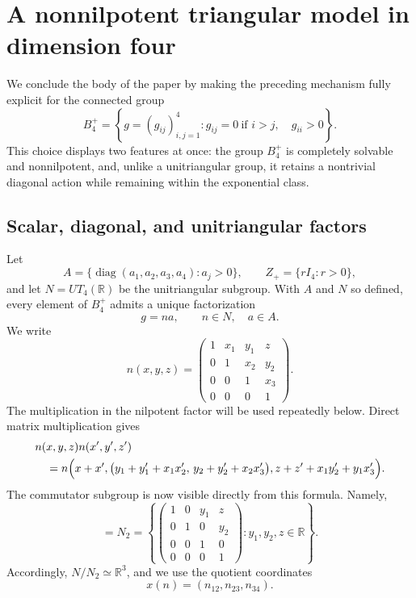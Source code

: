 \documentclass[10pt,a4paper]{amsart}
\numberwithin{equation}{section}
\newcommand{\R}{\mathbb R}
\begin{document}
\section{A nonnilpotent triangular model in dimension four}
\label{sec:B4-model}

We conclude the body of the paper by making the preceding mechanism fully
explicit for the connected group
\[
 B_4^+
 =
 \left\{
 g=(g_{ij})_{i,j=1}^4:
 g_{ij}=0\ \text{if }i>j,\quad g_{ii}>0
 \right\}.
\]
This choice displays two features at once: the group $B_4^+$ is completely
solvable and nonnilpotent, and, unlike a unitriangular group, it retains a
nontrivial diagonal action while remaining within the exponential
class.

\subsection{Scalar, diagonal, and unitriangular factors}

Let
\[
 A=\{\operatorname{diag}(a_1,a_2,a_3,a_4):a_j>0\},
 \qquad
 Z_+=\{rI_4:r>0\},
\]
and let $N=UT_4(\R)$ be the unitriangular subgroup.  With $A$ and $N$ so
defined, every element of $B_4^+$ admits a unique factorization
\[
 g=na,\qquad n\in N,\quad a\in A.
\]
We write
\[
 n(x,y,z)=
 \begin{pmatrix}
 1&x_1&y_1&z\\
 0&1&x_2&y_2\\
 0&0&1&x_3\\
 0&0&0&1
 \end{pmatrix}.
\]
The multiplication in the nilpotent factor will be used repeatedly below.
Direct matrix multiplication gives
\begin{align}
 &n(x,y,z)n(x',y',z') \notag\\
 &\quad =
 n\Bigl(
 x+x',
 \bigl(y_1+y_1'+x_1x_2',\,y_2+y_2'+x_2x_3'\bigr),
 z+z'+x_1y_2'+y_1x_3'
 \Bigr).
 \label{eq:B4-N-law}
\end{align}
The commutator subgroup is now visible directly from this formula.  Namely,
\begin{equation}
 [N,N]
 =N_2
 =\left\{
 \begin{pmatrix}
 1&0&y_1&z\\
 0&1&0&y_2\\
 0&0&1&0\\
 0&0&0&1
 \end{pmatrix}
 :y_1,y_2,z\in\R
 \right\}.
 \label{eq:B4-N2}
\end{equation}
Accordingly, $N/N_2\simeq\R^3$, and we use the quotient coordinates
\[
 x(n)=(n_{12},n_{23},n_{34}).
\]
\end{document}
